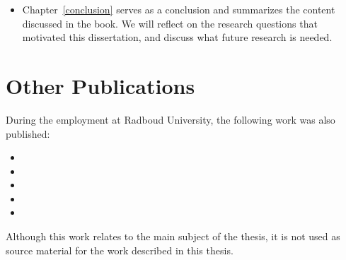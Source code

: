 \begin{itemize}
	{
		\scriptsize
		\begin{itemize}
			\item {}
		\end{itemize}
	}
	
	\item Chapter~\ref{conclusion} serves as a conclusion and summarizes the content discussed in the book. We will reflect on the research questions that motivated this dissertation, and discuss what future research is needed.
\end{itemize}

\section{Other Publications}
During the employment at Radboud University, the following work was also published: 

{\scriptsize
	\begin{itemize}	
		\item {}
		\item {}	
		\item {}
		\item {}
		\item {}
	\end{itemize}
}

Although this work relates to the main subject of the thesis, it is not used as source material for the work described in this thesis. 